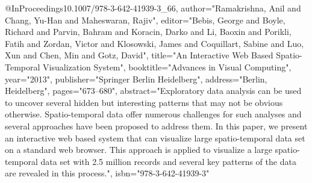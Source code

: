 @InProceedings{10.1007/978-3-642-41939-3_66,
author="Ramakrishna, Anil
and Chang, Yu-Han
and Maheswaran, Rajiv",
editor="Bebis, George
and Boyle, Richard
and Parvin, Bahram
and Koracin, Darko
and Li, Baoxin
and Porikli, Fatih
and Zordan, Victor
and Klosowski, James
and Coquillart, Sabine
and Luo, Xun
and Chen, Min
and Gotz, David",
title="An Interactive Web Based Spatio-Temporal Visualization System",
booktitle="Advances in Visual Computing",
year="2013",
publisher="Springer Berlin Heidelberg",
address="Berlin, Heidelberg",
pages="673--680",
abstract="Exploratory data analysis can be used to uncover several hidden but interesting patterns that may not be obvious otherwise. Spatio-temporal data offer numerous challenges for such analyses and several approaches have been proposed to address them. In this paper, we present an interactive web based system that can visualize large spatio-temporal data set on a standard web browser. This approach is applied to visualize a large spatio-temporal data set with 2.5 million records and several key patterns of the data are revealed in this process.",
isbn="978-3-642-41939-3"
}

